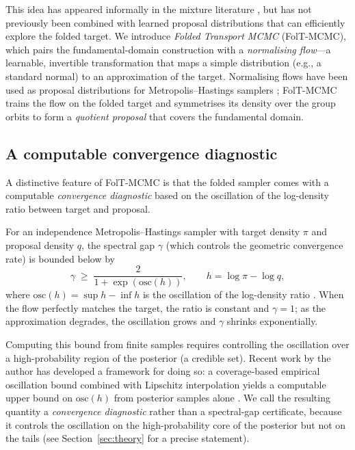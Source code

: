 This idea has appeared informally in the mixture literature
\citep{Celeux2000,FruhwirthSchnatter2001}, but has not previously
been combined with learned proposal distributions that can
efficiently explore the folded target.  We introduce
\emph{Folded Transport MCMC} (FolT-MCMC), which pairs the
fundamental-domain construction with a \emph{normalising flow}---a
learnable, invertible transformation that maps a simple
distribution (e.g., a standard normal) to an approximation of
the target.  Normalising flows have been used as proposal
distributions for Metropolis--Hastings samplers
\citep{Parno2018,Hoffman2019,Gabrie2022}; FolT-MCMC trains the
flow on the folded target and symmetrises its density over the
group orbits to form a \emph{quotient proposal} that covers
the fundamental domain.

\subsection{A computable convergence diagnostic}

A distinctive feature of FolT-MCMC is that the folded sampler
comes with a computable \emph{convergence diagnostic} based
on the oscillation of the log-density ratio between target and
proposal.

For an independence Metropolis--Hastings sampler with target
density $\pi$ and proposal density $q$, the spectral gap
$\gamma$ (which controls the geometric convergence rate) is
bounded below by
\[
  \gamma \;\geq\; \frac{2}{1 + \exp(\mathrm{osc}(h))},
  \qquad
  h = \log\pi - \log q,
\]
where $\mathrm{osc}(h) = \sup h - \inf h$ is the oscillation
of the log-density ratio \citep{MengersenTweedie1996}.
When the flow perfectly matches the target, the ratio is
constant and $\gamma = 1$; as the approximation degrades,
the oscillation grows and $\gamma$ shrinks exponentially.

Computing this bound from finite samples requires controlling
the oscillation over a high-probability region of the posterior
(a credible set).  Recent work by the author has developed a
framework for doing so: a coverage-based empirical oscillation
bound combined with Lipschitz interpolation yields a computable
upper bound on $\mathrm{osc}(h)$ from posterior samples alone
\citep{LCNF,CerTMCMC}.  We call the resulting quantity a
\emph{convergence diagnostic} rather than a spectral-gap
certificate, because it controls the oscillation on the
high-probability core of the posterior but not on the tails
(see Section~\ref{sec:theory} for a precise statement).

